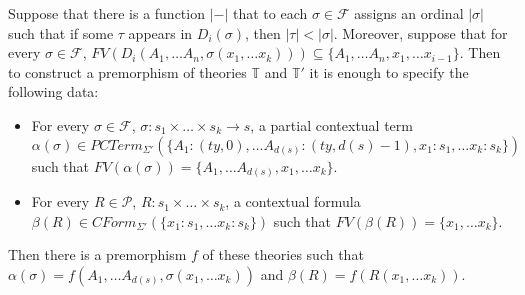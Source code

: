 \documentclass[reqno]{amsart}
\theoremstyle{definition}
\theoremstyle{remark}
\numberwithin{figure}{section}
\begin{document}
\begin{prop}
Suppose that there is a function $|-|$ that to each $\sigma \in \mathcal{F}$ assigns an ordinal $|\sigma|$ such that if some $\tau$ appears in $D_i(\sigma)$, then $|\tau| < |\sigma|$.
Moreover, suppose that for every $\sigma \in \mathcal{F}$, $FV(D_i(A_1, \ldots A_n, \sigma(x_1, \ldots x_k))) \subseteq \{ A_1, \ldots A_n, x_1, \ldots x_{i-1} \}$.
Then to construct a premorphism of theories $\mathbb{T}$ and $\mathbb{T}'$ it is enough to specify the following data:
\begin{itemize}
\item For every $\sigma \in \mathcal{F}$, $\sigma : s_1 \times \ldots \times s_k \to s$,
    a partial contextual term $\alpha(\sigma) \in PCTerm_{\Sigma'}(\{ A_1 : (ty,0), \ldots A_{d(s)} : (ty,d(s)-1), x_1 : s_1, \ldots x_k : s_k \})$
    such that $FV(\alpha(\sigma)) = \{ A_1, \ldots A_{d(s)}, x_1, \ldots x_k \}$.
\item For every $R \in \mathcal{P}$, $R : s_1 \times \ldots \times s_k$,
    a contextual formula $\beta(R) \in CForm_{\Sigma'}(\{ x_1 : s_1, \ldots x_k : s_k \})$ such that $FV(\beta(R)) = \{ x_1, \ldots x_k \}$.
\end{itemize}
Then there is a premorphism $f$ of these theories such that
$\alpha(\sigma) = f(A_1, \ldots A_{d(s)}, \allowbreak \sigma(x_1, \ldots x_k))$ and $\beta(R) = f(R(x_1, \ldots x_k))$.
\end{prop}
\end{document}
